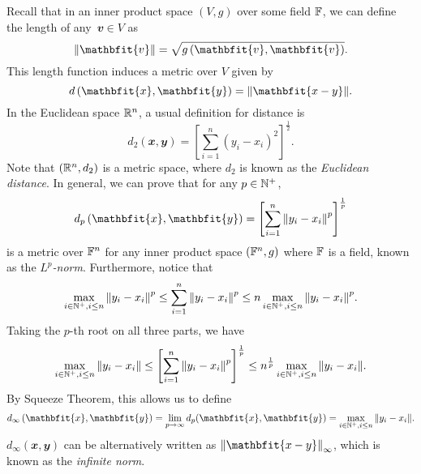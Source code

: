 \documentclass[math]{amznotes}
\theoremstyle{remark}
\begin{document}
Recall that in an inner product space $\left(V, g\right)$ over some field $\mathbb{F}$, we can define the length of any~$\mathbfit{v} \in V$ as 
\begin{equation*}
    \norm{\mathbfit{v}} = \sqrt{g\left(\mathbfit{v}, \mathbfit{v}\right)}.
\end{equation*}
This length function induces a metric over $V$ given by 
\begin{equation*}
    d\left(\mathbfit{x}, \mathbfit{y}\right) = \norm{\mathbfit{x - y}}.
\end{equation*}
In the Euclidean space $\mathbb{R}^n$, a usual definition for distance is
\begin{equation*}
    d_2\left(\mathbfit{x}, \mathbfit{y}\right) = \left[\sum_{i = 1}^{n}\left(y_i - x_i\right)^2\right]^{\frac{1}{2}}.
\end{equation*}
Note that $\left(\mathbb{R}^n, d_2\right)$ is a metric space, where $d_2$ is known as the \textit{Euclidean distance}. In general, we can prove that for any $p \in \mathbb{N}^+$,
\begin{equation*}
    d_p\left(\mathbfit{x}, \mathbfit{y}\right) = \left[\sum_{i = 1}^{n}\norm{y_i - x_i}^p\right]^{\frac{1}{p}}
\end{equation*}
is a metric over $\mathbb{F}^n$ for any inner product space $\left(\mathbb{F}^n, g\right)$ where $\mathbb{F}$ is a field, known as the $L^p$\textit{-norm}. Furthermore, notice that
\begin{equation*}
    \max_{i \in \mathbb{N}^+, i \leq n}{\left\lVert {y_i - x_i} \right\rVert}^p \leq \sum_{i = 1}^{n}{\left\lVert {y_i - x_i} \right\rVert}^p \leq n\max_{i \in \mathbb{N}^+, i \leq n}{\left\lVert {y_i - x_i} \right\rVert}^p.
\end{equation*}
Taking the $p$-th root on all three parts, we have
\begin{equation*}
    \max_{i \in \mathbb{N}^+, i \leq n}{\left\lVert {y_i - x_i} \right\rVert} \leq \left[\sum_{i = 1}^{n}{\left\lVert {y_i - x_i} \right\rVert}^p\right]^{\frac{1}{p}} \leq n^{\frac{1}{p}}\max_{i \in \mathbb{N}^+, i \leq n}{\left\lVert {y_i - x_i} \right\rVert}.
\end{equation*}
By Squeeze Theorem, this allows us to define
\begin{equation*}
    d_\infty\left(\mathbfit{x}, \mathbfit{y}\right) = \lim_{p \to \infty}d_p(\mathbfit{x}, \mathbfit{y}) = \max_{i \in \N^+, i \leq n}\norm{y_i - x_i}.
\end{equation*}
$d_\infty\left(\mathbfit{x}, \mathbfit{y}\right)$ can be alternatively written as $\norm{\mathbfit{x - y}}_\infty$, which is known as the \textit{infinite norm}.
\end{document}
